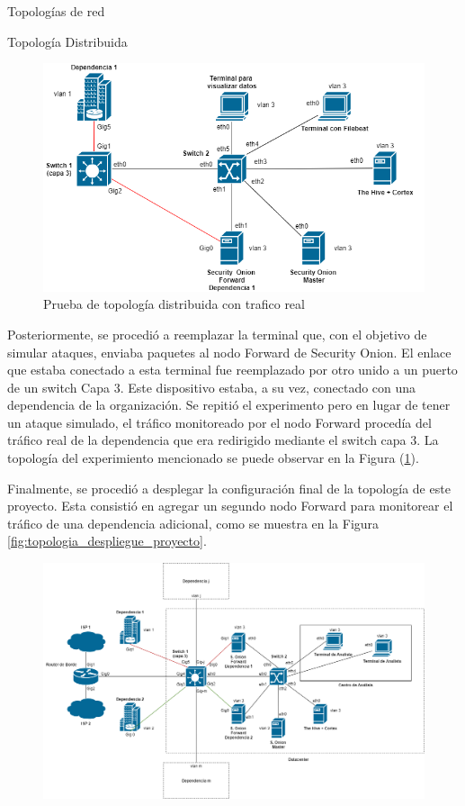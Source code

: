 \begin{section}{Topologías de red }
\begin{subsection} {Topología Distribuida}
\begin{figure}[h]
            \centering
             \includegraphics[width=1\textwidth]{./iteracion_1_imagenes/figura_33_d_topologia_de_prueba_4.png}
                \caption{Prueba de topología distribuida con trafico real}
              \label{fig:topologia_distribuida_4}
            \end{figure}
            \FloatBarrier
            Posteriormente, se procedió a reemplazar la terminal que, con el objetivo de simular ataques, enviaba paquetes al nodo Forward de Security Onion. El enlace que estaba conectado a esta terminal fue reemplazado por otro unido a un puerto de un switch Capa 3. Este dispositivo estaba, a su vez, conectado con una dependencia de la organización. Se repitió el experimento pero en lugar de tener un ataque simulado, el tráfico monitoreado por el nodo Forward procedía del tráfico real de la dependencia que era redirigido mediante el switch capa 3. La topología del experimiento mencionado se puede observar en la Figura (\ref{fig:topologia_distribuida_4}).\par
            Finalmente, se procedió a desplegar la configuración final de la topología de este proyecto. Esta consistió en agregar un segundo nodo Forward para monitorear el tráfico de una dependencia adicional, como se muestra en la Figura \ref{fig:topologia_despliegue_proyecto}.
            \par
            \begin{figure}[H]
                \centering
                \includegraphics[width=1\textwidth]{./iteracion_1_imagenes/figura_33_arquitectura_despliegue_proyecto.png}

\end{figure}
\end{subsection}
\end{section}
